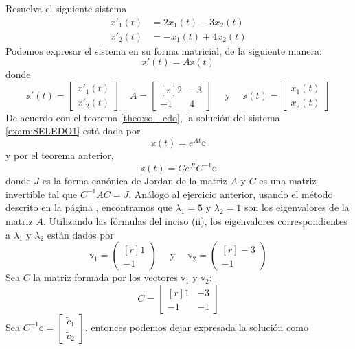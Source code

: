 \begin{example}
    Resuelva el siguiente sistema
    \begin{align*}
        x'_1(t) & = 2x_1(t) - 3x_2(t) \\
        x'_2(t) & = - x_1(t) + 4x_2(t)
    \end{align*}
    \solucion Podemos expresar el sistema en su forma matricial, de la siguiente manera:
    $$\mathbb{x}'(t) = A\mathbb{x}(t)$$
    donde
    $$\mathbb{x}'(t) = \begin{bmatrix} x'_1(t) \\ x'_2(t) \end{bmatrix} \quad A = \begin{bmatrix*}[r] 2 & -3 \\ -1 & 4 \end{bmatrix*} \quad \text{ y } \quad \mathbb{x}(t) = \begin{bmatrix} x_1(t) \\ x_2(t) \end{bmatrix}$$
    De acuerdo con el teorema \ref{theo:sol_edo}, la solución del sistema \eqref{exam:SELEDO1} está dada por
    $$\mathbb{x}(t) = e^{At} \mathbb{c}$$
    y por el teorema anterior,
    $$\mathbb{x}(t) = Ce^{Jt}C^{-1} \mathbb{c}$$
    donde $J$ es la forma canónica de Jordan de la matriz $A$ y $C$ es una matriz invertible tal que $C^{-1}AC = J$. Análogo al ejercicio anterior, usando el método descrito en la página \pageref{metodo_eigen_2x2}, encontramos que $\lambda_1 = 5$ y $\lambda_2 = 1$ son los eigenvalores de la matriz $A$. Utilizando las fórmulas del inciso (ii), los eigenvalores correspondientes a $\lambda_1$ y $\lambda_2$ están dados por
    $$\mathbb{v}_1 = \begin{pmatrix*}[r] 1 \\ -1 \end{pmatrix*} \quad \text{ y } \quad \mathbb{v}_2 = \begin{pmatrix*}[r] -3 \\ -1 \end{pmatrix*}$$\newpage\noindent
    Sea $C$ la matriz formada por los vectores $\mathbb{v}_1$ y $\mathbb{v}_2$:
    $$C = \begin{bmatrix*}[r]
        1 & -3 \\
        -1 & -1
    \end{bmatrix*}$$
    Sea $C^{-1} \mathbb{c} = \begin{bmatrix} \tilde{c}_1 \\ \tilde{c}_2 \end{bmatrix}$, entonces podemos dejar expresada la solución como

\end{example}
